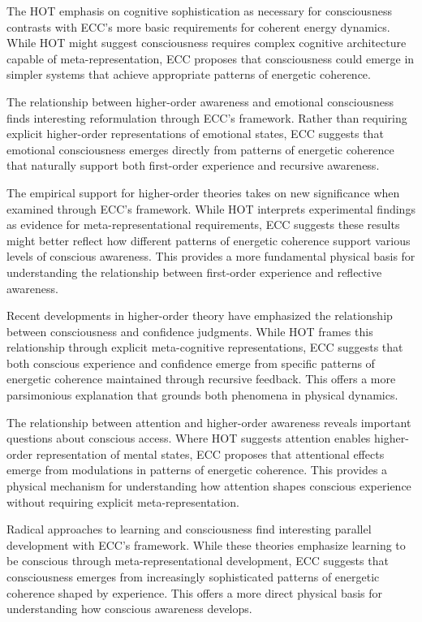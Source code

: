 The HOT emphasis on cognitive sophistication as necessary for consciousness \cite{Brown2019} contrasts with ECC's more basic requirements for coherent energy dynamics. While HOT might suggest consciousness requires complex cognitive architecture capable of meta-representation, ECC proposes that consciousness could emerge in simpler systems that achieve appropriate patterns of energetic coherence.

The relationship between higher-order awareness and emotional consciousness \cite{LeDoux2017} finds interesting reformulation through ECC's framework. Rather than requiring explicit higher-order representations of emotional states, ECC suggests that emotional consciousness emerges directly from patterns of energetic coherence that naturally support both first-order experience and recursive awareness.

The empirical support for higher-order theories \cite{Lau2011} takes on new significance when examined through ECC's framework. While HOT interprets experimental findings as evidence for meta-representational requirements, ECC suggests these results might better reflect how different patterns of energetic coherence support various levels of conscious awareness. This provides a more fundamental physical basis for understanding the relationship between first-order experience and reflective awareness.

Recent developments in higher-order theory \cite{Brown2019} have emphasized the relationship between consciousness and confidence judgments. While HOT frames this relationship through explicit meta-cognitive representations, ECC suggests that both conscious experience and confidence emerge from specific patterns of energetic coherence maintained through recursive feedback. This offers a more parsimonious explanation that grounds both phenomena in physical dynamics.

The relationship between attention and higher-order awareness \cite{Rosenthal2019} reveals important questions about conscious access. Where HOT suggests attention enables higher-order representation of mental states, ECC proposes that attentional effects emerge from modulations in patterns of energetic coherence. This provides a physical mechanism for understanding how attention shapes conscious experience without requiring explicit meta-representation.

Radical approaches to learning and consciousness \cite{Cleeremans2011} find interesting parallel development with ECC's framework. While these theories emphasize learning to be conscious through meta-representational development, ECC suggests that consciousness emerges from increasingly sophisticated patterns of energetic coherence shaped by experience. This offers a more direct physical basis for understanding how conscious awareness develops.

